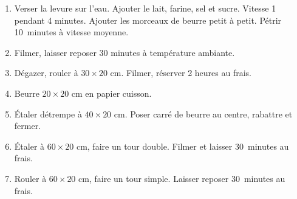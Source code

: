 

\begin{ingredients}
\end{ingredients}


\begin{recipe}
  \begin{enumerate}

  \item Verser la levure sur l'eau.  Ajouter le lait, farine, sel et
    sucre.  Vitesse 1 pendant 4 minutes.  Ajouter les morceaux de
    beurre petit à petit.  Pétrir 10~minutes à vitesse moyenne.

  \item Filmer, laisser reposer 30 minutes à température ambiante.

  \item Dégazer, rouler à $30 \times 20$ cm.  Filmer, réserver 2 heures au frais.

  \item Beurre $20 \times 20$ cm en papier cuisson.

  \item Étaler détrempe à $40 \times 20$ cm.  Poser carré de beurre au
    centre, rabattre et fermer.

  \item Étaler à $60 \times 20$ cm, faire un tour double.  Filmer et
    laisser 30~minutes au frais.

  \item Rouler à $60 \times 20$ cm, faire un tour simple.  Laisser
    reposer 30~minutes au frais.
  \end{enumerate}
\end{recipe}

\begin{ingredients}
\end{ingredients}

